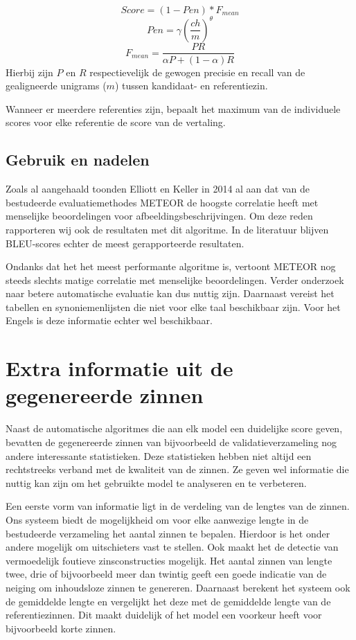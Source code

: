 \begin{equation}
Score = (1 - Pen)*F_{mean}
\end{equation} 
\begin{equation}
Pen = \gamma (\frac{ch}{m})^\theta 
\end{equation}
\begin{equation}
F_{mean} = \frac{PR}{\alpha P + (1- \alpha)R}
\end{equation}
Hierbij zijn $P$ en $R$ respectievelijk de gewogen precisie en recall van de gealigneerde unigrams ($m$) tussen kandidaat- en referentiezin.

Wanneer er meerdere referenties zijn, bepaalt het maximum van de individuele scores voor elke referentie de score van de vertaling.

\subsection{Gebruik en nadelen}
Zoals al aangehaald toonden Elliott en Keller in 2014 al aan dat van de bestudeerde evaluatiemethodes METEOR de hoogste correlatie heeft met menselijke beoordelingen voor afbeeldingsbeschrijvingen. Om deze reden rapporteren wij ook de resultaten met dit algoritme. In de literatuur blijven BLEU-scores echter de meest gerapporteerde resultaten.

Ondanks dat het het meest performante algoritme is, vertoont METEOR nog steeds slechts matige correlatie met menselijke beoordelingen. Verder onderzoek naar betere automatische evaluatie kan dus nuttig zijn. Daarnaast vereist het tabellen en synoniemenlijsten die niet voor elke taal beschikbaar zijn. Voor het Engels is deze informatie echter wel beschikbaar. 


\section{Extra informatie uit de gegenereerde zinnen}
Naast de automatische algoritmes die aan elk model een duidelijke score geven, bevatten de gegenereerde zinnen van bijvoorbeeld de validatieverzameling nog andere interessante statistieken. Deze statistieken hebben niet altijd een rechtstreeks verband met de kwaliteit van de zinnen. Ze geven wel informatie die nuttig kan zijn om het gebruikte model te analyseren en te verbeteren.

Een eerste vorm van informatie ligt in de verdeling van de lengtes van de zinnen. Ons systeem biedt de mogelijkheid om voor elke aanwezige lengte in de bestudeerde verzameling het aantal zinnen te bepalen. Hierdoor is het onder andere mogelijk om uitschieters vast te stellen. Ook maakt het de detectie van vermoedelijk foutieve zinsconstructies mogelijk. Het aantal zinnen van lengte twee, drie of bijvoorbeeld meer dan twintig geeft een goede indicatie van de neiging om inhoudsloze zinnen te genereren. Daarnaast berekent het systeem ook de gemiddelde lengte en vergelijkt het deze met de gemiddelde lengte van de referentiezinnen. Dit maakt duidelijk of het model een voorkeur heeft voor bijvoorbeeld korte zinnen.

